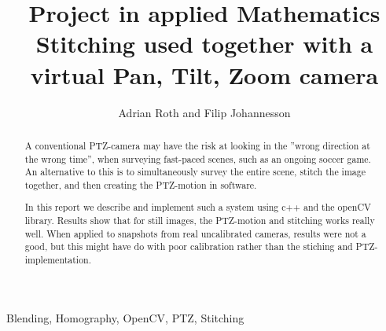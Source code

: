 \documentclass[10 pt, journal]{IEEEtran}
\title{Project in applied Mathematics \\
  \large Stitching used together with a virtual Pan, Tilt, Zoom camera}
\author{Adrian Roth and Filip Johannesson}
\begin{document}
\maketitle
\begin{abstract}
	A conventional PTZ-camera may have the risk at looking in the ''wrong direction at the wrong time'', when surveying fast-paced scenes, such as an ongoing soccer game. An alternative to this is to simultaneously survey the entire scene, stitch the image together, and then creating the PTZ-motion in software.

	In this report we describe and implement such a system using c++ and the openCV library. Results show that for still images, the PTZ-motion and stitching works really well. 
	When applied to snapshots from real uncalibrated cameras, results were not a good, but this might have do with poor calibration rather than the stiching and PTZ-implementation.
\end{abstract}
\begin{IEEEkeywords}
	Blending, Homography, OpenCV, PTZ, Stitching 
\end{IEEEkeywords}













\newpage


\end{document}
